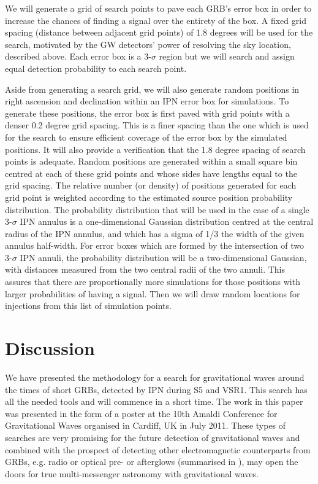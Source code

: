 \documentclass[a4paper]{jpconf}
\begin{document}
We will generate a grid of search points to pave each GRB's error box in order to increase the chances of finding a signal over the entirety of the box. A fixed grid spacing (distance between adjacent grid points) of 1.8 degrees will be used for the search, motivated by the GW detectors' power of resolving the sky location, described above. Each error box is a 3-$\sigma$ region but we will search and assign equal detection probability to each search point.


Aside from generating a search grid, we will also generate random positions in right ascension and declination within an IPN error box for simulations. To generate these positions, the error box is first paved with grid points with a denser 0.2 degree grid spacing. This is a finer spacing than the one which is used for the search to ensure efficient coverage of the error box by the simulated positions. It will also provide a verification that the 1.8 degree spacing of search points is adequate.  Random positions are generated within a small square bin centred at each of these grid points and whose sides have lengths equal to the grid spacing. The relative number (or density) of positions generated for each grid point is weighted according to the estimated source position probability distribution. The probability distribution that will be used in the case of a single 3-$\sigma$ IPN annulus is a one-dimensional Gaussian distribution centred at the central radius of the IPN annulus, and which has a sigma of 1/3 the width of the given annulus half-width. For error boxes which are formed by the intersection of two 3-$\sigma$ IPN annuli, the probability distribution will be a two-dimensional Gaussian, with distances measured from the two central radii of the two annuli. This assures that there are proportionally more simulations for those positions with larger probabilities of having a signal. Then we will draw random locations for injections from this list of simulation points.

\section{Discussion}

We have presented the methodology for a search for gravitational waves around the times of short GRBs, detected by IPN during S5 and VSR1. This search has all the needed tools and will commence in a short time. The work in this paper was presented in the form of a poster at the 10th Amaldi Conference for Gravitational Waves organised in Cardiff, UK in July 2011. These types of searches are very promising for the future detection of gravitational waves and combined with the prospect of detecting other electromagnetic counterparts from GRBs, e.g. radio or optical pre- or afterglows (summarised in \cite{Predoi:2009af, Coward:2011yr}), may open the doors for true multi-messenger astronomy with gravitational waves.
\end{document}
